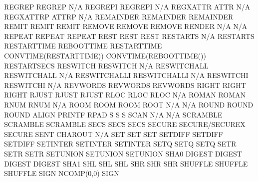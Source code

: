 \documentclass[letterpaper,10pt,english]{sphinxmanual}
\begin{document}
\begin{sphinxVerbatim}[commandchars=\\\{\}]
REGREP                  REGREP                       N/A
REGREPI                 REGREPI                      N/A
REGXATTR                ATTR                         N/A
REGXATTRP               ATTRP                        N/A
REMAINDER               REMAINDER                    REMAINDER
REMIT                   REMIT                        REMIT
REMOVE                  REMOVE                       REMOVE
RENDER                  N/A                          N/A
REPEAT                  REPEAT                       REPEAT
REST                    REST                         REST
RESTARTS                N/A                          RESTARTS
RESTARTTIME             REBOOTTIME                   RESTARTTIME
CONVTIME(RESTARTTIME))  CONVTIME(REBOOTTIME())       RESTARTSECS
RESWITCH                RESWITCH                     N/A
RESWITCHALL             RESWITCHALL                  N/A
RESWITCHALLI            RESWITCHALLI                 N/A
RESWITCHI               RESWITCHI                    N/A
REVWORDS                REVWORDS                     REVWORDS
RIGHT                   RIGHT                        RIGHT
RJUST                   RJUST                        RJUST
RLOC                    RLOC                         RLOC
N/A                     ROMAN                        ROMAN
RNUM                    RNUM                         N/A
ROOM                    ROOM                         ROOM
ROOT                    N/A                          N/A
ROUND                   ROUND                        ROUND
ALIGN                   PRINTF                       RPAD
S                       S                            S
SCAN                    N/A                          N/A
SCRAMBLE                SCRAMBLE                     SCRAMBLE
SECS                    SECS                         SECS
SECURE                  SECURE/SECUREX               SECURE
SENT                    CHAROUT                      N/A
SET                     SET                          SET
SETDIFF                 SETDIFF                      SETDIFF
SETINTER                SETINTER                     SETINTER
SETQ                    SETQ                         SETQ
SETR                    SETR                         SETR
SETUNION                SETUNION                     SETUNION
SHA0                    DIGEST                       DIGEST
DIGEST                  DIGEST                       SHA1
SHL                     SHL                          SHL
SHR                     SHR                          SHR
SHUFFLE                 SHUFFLE                      SHUFFLE
SIGN                    NCOMP(\PYGZpc{}0,0)                  SIGN

\end{sphinxVerbatim}
\end{document}
